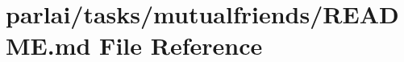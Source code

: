 \hypertarget{parlai_2tasks_2mutualfriends_2README_8md}{}\section{parlai/tasks/mutualfriends/\+R\+E\+A\+D\+ME.md File Reference}
\label{parlai_2tasks_2mutualfriends_2README_8md}
